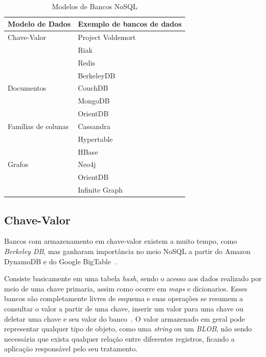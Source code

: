 ~\begin{table}[]
\centering
\caption{Modelos de Bancos NoSQL}
\label{tab:modelosnosql}
\begin{tabular}{ll}
\textbf{Modelo de Dados}     & \textbf{Exemplo de bancos de dados}      \\ \hline
Chave-Valor         & Project Voldemort               \\
                    & Riak                            \\
                    & Redis                           \\
                    & BerkeleyDB                      \\ \hline
Documentos          & CouchDB                         \\
                    & MongoDB                         \\
                    & OrientDB                        \\ \hline
Famílias de colunas & Cassandra                       \\
					& Hypertable                      \\
                    & HBase                           \\ \hline
Grafos              & Neo4j \\
                    & OrientDB                        \\
                    & Infinite Graph                 
\end{tabular}
\end{table}

\subsection*{Chave-Valor}
Bancos com armazenamento em chave-valor existem a muito tempo, como \emph{Berkeley DB}, mas ganharam importância no meio NoSQL a partir do Amazon DynamoDB e do Google BigTable~\cite{chrisnosql}.

Consiste basicamente em uma tabela \emph{hash}, sendo o acesso aos dados realizado por meio de uma chave primaria, assim como ocorre em \emph{maps} e dicionarios.  Esses bancos são completamente livres de esquema e suas operações se resumem a consultar o valor a partir de uma chave, inserir um valor para uma chave ou deletar uma chave e seu valor do banco~\cite{nosqleval}. O valor armazenado em geral pode representar qualquer tipo de objeto, como uma \emph{string} ou um \emph{BLOB}, não sendo necessária que exista qualquer relação entre diferentes registros, ficando a aplicação responsável pelo seu tratamento. 

